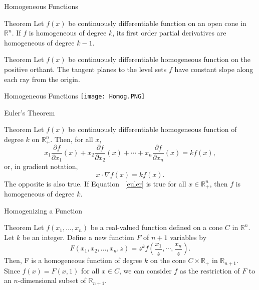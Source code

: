 \documentclass{beamer}
\begin{document}
\begin{frame}{Homogeneous Functions}

\begin{block}{Theorem }
 Let $f(x)$ be continuously differentiable function on an open cone in $\mathbb{R}^n$. If $f$ is homogeneous of degree $k$, its first order partial derivatives are homogeneous of degree $k-1$.

\end{block}
\begin{block}{Theorem }
Let $f(x)$ be continuously differentiable homogeneous function on the positive orthant. The tangent planes to the level sets $f$ have constant slope along each ray from the origin.
\end{block}
\end{frame}

\begin{frame}{Homogeneous Functions}
\texttt{[image: Homog.PNG]}
\end{frame}


\begin{frame}{Euler's Theorem}
    \begin{block}
{Theorem} 
Let $f(x)$ be continuously differentiable homogeneous function of degree $k$ on $\mathbb{R}_+^n. $ Then, for all $x$,
\begin{equation}
    x_1\frac{\partial f}{\partial x_1}(x)+x_2\frac{\partial f}{\partial x_2}(x)+\cdots +x_n\frac{\partial f}{ \partial x_n}(x)=kf(x), \label{euler}
\end{equation}
or, in gradient notation, 
\[x\cdot \nabla f(x)=k f(x).
\]
The opposite is also true. If Equation ~\eqref{euler} is true for all $x\in \mathbb{R}_+^n$, then $f$ is homogeneous of degree $k$. 
    \end{block}
\end{frame}

\begin{frame}{Homogenizing a Function}
    \begin{block}{Theorem}
    Let $f(x_1,...,x_n)$ be a real-valued function defined on a cone $C$ in $\mathbb{R}^n$. Let $k$ be an integer. Define a new function $F$ of $n+1$ variables by 
    \[F(x_1,x_2,..., x_n,z)=z^kf\left(\frac{x_1}{z}, \cdots,\frac{x_n}{z}\right).
    \]
    Then, F is a homogeneous function of degree $k$ on the cone $C\times \mathbb{R}_+$ in $\mathbb{R}_{n+1}$. Since $f(x)=F(x,1)$ for all $x\in C$, we can consider $f$ as the restriction of $F$ to an $n$-dimensional subset of $\mathbb{R}_{n+1}$. 
    \end{block}
\end{frame}
\end{document}
